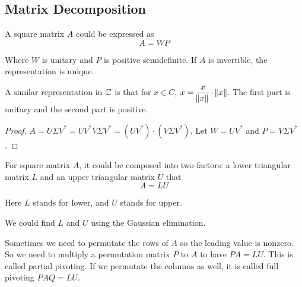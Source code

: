 \subsection{Matrix Decomposition}



\begin{theorem}
    A square matrix $A$ could be expressed as 
    \begin{equation}
        A = WP
    \end{equation}
    
    Where $W$ is unitary and $P$ is positive semidefinite. If $A$ is invertible, the representation is unique. 
    
    A similar representation in $\mathbb{C}$ is that for $x \in C$, $\displaystyle x = \frac{x}{\norm{x}} \cdot \norm{x}$. The first part is unitary and the second part is positive.
\end{theorem}
\begin{proof}
    $A = U\Sigma V^* = U V^* V \Sigma V^* = (U V^*) \cdot (V \Sigma V^*)$. Let $W = U V^*$ and $P = V \Sigma V^*$.
\end{proof}


\begin{theorem}[LU Decomposition]
    For square matrix $A$, it could be composed into two factors: a lower triangular matrix $L$ and an upper triangular matrix $U$ that
    \begin{equation}
        A = LU
    \end{equation}
    
    Here $L$ stands for lower, and $U$ stands for upper.
    
    We could find $L$ and $U$ using the Gaussian elimination.
    
    Sometimes we need to permutate the rows of $A$ so the leading value is nonzero. So we need to multiply a permutation matrix $P$ to $A$ to have $PA = LU$. This is called partial pivoting. If we permutate the columns as well, it is called full pivoting $PAQ = LU$.
\end{theorem}

